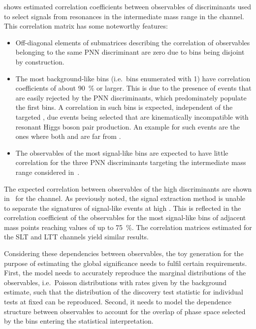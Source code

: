  shows estimated
correlation coefficients between observables of discriminants used to
select signals from resonances in the intermediate mass range in the
\hadhad channel. This correlation matrix has some noteworthy features:
\begin{itemize}
\item Off-diagonal elements of submatrices describing the correlation
  of observables belonging to the same PNN discriminant are zero due
  to bins being disjoint by construction.

\item The most background-like bins (i.e.\ bins enumerated with 1)
  have correlation coefficients of about \SI{90}{\percent} or
  larger. This is due to the presence of events that are easily
  rejected by the PNN discriminants, which predominately populate the
  first bins. A correlation in such bins is expected, independent of
  the targeted \mX, due events being selected that are kinematically
  incompatible with resonant Higgs boson pair production. An example
  for such events are the ones where both \mMMC and \mBB are far from
  \mH.

\item The observables of the most signal-like bins are expected to
  have little correlation for the three PNN discriminants targeting
  the intermediate mass range considered
  in~.
\end{itemize}

The expected correlation between observables of the high \mX
discriminants are shown
in~ for the \hadhad
channel. As previously noted, the signal extraction method is unable
to separate the signatures of signal-like events at high \mX. This is
reflected in the correlation coefficient of the observables for the
most signal-like bins of adjacent mass points reaching values of up to
\SI{75}{\percent}. The correlation matrices estimated for the \lephad
SLT and LTT channels yield similar results.

Considering these dependencies between observables, the toy generation
for the purpose of estimating the global significance needs to fulfil
certain requirements. First, the model needs to accurately reproduce
the marginal distributions of the observables, i.e.\ Poisson
distributions with rates given by the background estimate, such that
the distribution of the discovery test statistic for individual tests
at fixed \mX can be reproduced. Second, it needs to model the
dependence structure between observables to account for the overlap of
phase space selected by the bins entering the statistical
interpretation.

